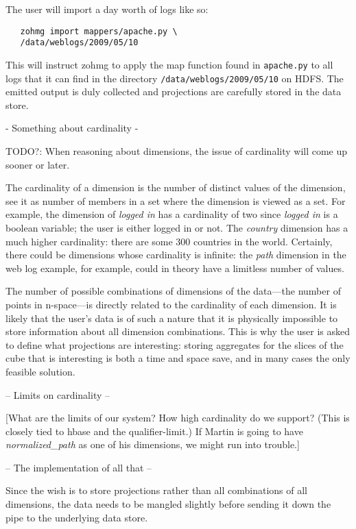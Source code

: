 The user will import a day worth of logs like so:

\begin{verbatim}
   zohmg import mappers/apache.py \
   /data/weblogs/2009/05/10
\end{verbatim}

This will instruct zohmg to apply the map function found in \texttt{apache.py}
to all logs that it can find in the directory
\texttt{/data/weblogs/2009/05/10} on HDFS. The emitted output is duly
collected and projections are carefully stored in the data store.

- Something about cardinality -

TODO?: When reasoning about dimensions, the issue of cardinality will come
up sooner or later.

The cardinality of a dimension is the number of distinct values of the
dimension, see it as number of members in a set where the dimension is
viewed as a set. For example, the dimension of \textit{logged in} has a
cardinality of two since \textit{logged in} is a boolean variable; the user
is either logged in or not. The \textit{country} dimension has a much
higher cardinality: there are some 300 countries in the world. Certainly,
there could be dimensions whose cardinality is infinite: the \textit{path}
dimension in the web log example, for example, could in theory have a
limitless number of values.

The number of possible combinations of dimensions of the data---the number
of points in n-space---is directly related to the cardinality of each
dimension. It is likely that the user's data is of such a nature that it is
physically impossible to store information about all dimension
combinations.  This is why the user is asked to define what projections are
interesting: storing aggregates for the slices of the cube that is
interesting is both a time and space save, and in many cases the only
feasible solution.

-- Limits on cardinality --

[What are the limits of our system? How high cardinality do we support? (This
is closely tied to hbase and the qualifier-limit.) If Martin is going to have
\textit{normalized\_path} as one of his dimensions, we might run into trouble.]

-- The implementation of all that --

Since the wish is to store projections rather than all combinations of all
dimensions, the data needs to be mangled slightly before sending it down
the pipe to the underlying data store.

